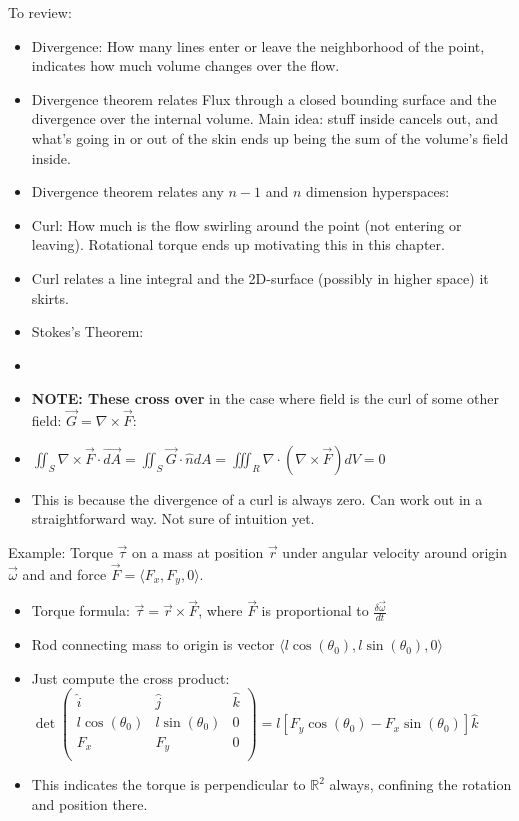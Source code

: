 \documentclass[11pt, oneside]{article}   	%
\begin{document}
To review:
\begin{itemize}
\item Divergence: How many lines enter or leave the neighborhood of the point, indicates how much volume changes over the flow.
\item Divergence theorem relates Flux through a closed bounding surface and the divergence over the internal volume. Main idea: stuff inside cancels out, and what's going in or out of the skin ends up being the sum of the volume's field inside.
\item Divergence theorem relates any $n-1$ and $n$ dimension hyperspaces: 
\item Curl: How much is the flow swirling around the point (not entering or leaving).  Rotational torque ends up motivating this in this chapter.
\item Curl relates a line integral and the 2D-surface (possibly in higher space) it skirts.
\item Stokes's Theorem: \item \fbox{$$}
\item \textbf{NOTE: These cross over} in the case where field is the curl of some other field: $\vec{G} = \nabla \times \vec{F}$:
\item $ \iint_S \nabla \times \vec{F} \cdot \vec{dA} = \iint_S \vec{G} \cdot \hat{n} dA = \iiint_R \nabla \cdot (\nabla \times \vec{F}) dV = 0$
\item This is because the divergence of a curl is always zero.  Can work out in a straightforward way.  Not sure of intuition yet.
\end{itemize}

Example: Torque $\vec{\tau}$ on a mass at position $\vec{r}$ under angular velocity around origin $\vec{\omega}$ and and force $\vec{F}= \langle F_x, F_y, 0\rangle$.
\begin{itemize}
\item Torque formula: $\vec{\tau} = \vec{r} \times \vec{F}$, where $\vec{F}$ is proportional to $\frac{\delta \vec{\omega}}{dt}$
\item Rod connecting mass to origin is vector $\langle l\cos(\theta_0),  l\sin(\theta_0), 0\rangle$
\item Just compute the cross product: $\det\begin{pmatrix}
\hat{i} &\hat{j} &\hat{k}  \\
l\cos(\theta_0) &  l\sin(\theta_0) &  0 \\
F_x & F_y &  0 \\
\end{pmatrix}  = l[F_y\cos(\theta_0) -F_x\sin(\theta_0)]\hat{k}  $
\item This indicates the torque is perpendicular to $\mathbb{R}^2$ always, confining the rotation and position there.
\end{itemize}
\end{document}
